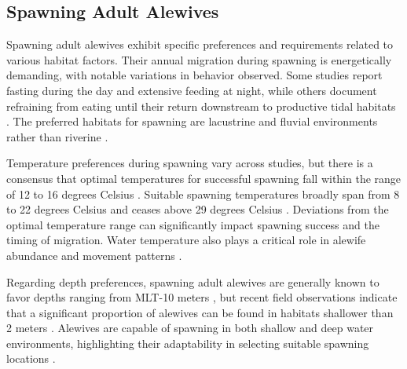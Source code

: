 \documentclass[
]{book}
\begin{document}
\hypertarget{spawning-adult-alewives}{%
\subsection{Spawning Adult Alewives}\label{spawning-adult-alewives}}

Spawning adult alewives exhibit specific preferences and requirements related to various habitat factors. Their annual migration during spawning is energetically demanding, with notable variations in behavior observed. Some studies report fasting during the day and extensive feeding at night, while others document refraining from eating until their return downstream to productive tidal habitats \citep{bigelow_fishes_1953, janssen_feeding_1980, bigelow_bigelow_2002}. The preferred habitats for spawning are lacustrine and fluvial environments rather than riverine \citep{reback_survey_2004, frank_role_2011, overton_spatial_2012}.

Temperature preferences during spawning vary across studies, but there is a consensus that optimal temperatures for successful spawning fall within the range of 12 to 16 degrees Celsius \citep{brown_habitat_2000}. Suitable spawning temperatures broadly span from 8 to 22 degrees Celsius \citep{tyus_movements_1974, pardue_habitat_1983, collette_fishes_2003, mather_assessing_2012} and ceases above 29 degrees Celsius \citep{kissil_spawning_1974, pardue_habitat_1983}. Deviations from the optimal temperature range can significantly impact spawning success and the timing of migration. Water temperature also plays a critical role in alewife abundance and movement patterns \citep{legett_daily_2021}.

Regarding depth preferences, spawning adult alewives are generally known to favor depths ranging from MLT-10 meters \citep{brown_habitat_2000}, but recent field observations indicate that a significant proportion of alewives can be found in habitats shallower than 2 meters \citep{mather_assessing_2012}. Alewives are capable of spawning in both shallow and deep water environments, highlighting their adaptability in selecting suitable spawning locations \citep{oconnell_spawning_1997}.
\end{document}
